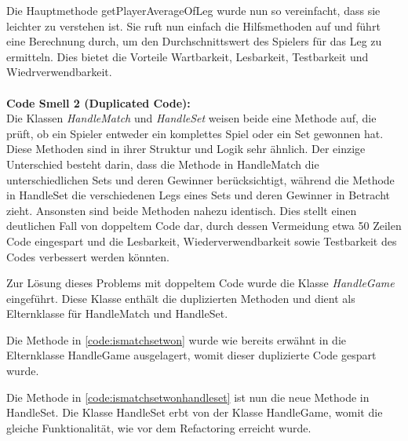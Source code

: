 Die Hauptmethode getPlayerAverageOfLeg wurde nun so vereinfacht, dass sie leichter zu verstehen ist. Sie ruft nun einfach die Hilfsmethoden auf und führt eine Berechnung durch, um den Durchschnittswert des Spielers für das Leg zu ermitteln. Dies bietet die Vorteile Wartbarkeit, Lesbarkeit, Testbarkeit und Wiedrverwendbarkeit.\\\\
\textbf{Code Smell 2 (Duplicated Code):}\\
Die Klassen \textit{HandleMatch} und \textit{HandleSet} weisen beide eine Methode auf, die prüft, ob ein Spieler entweder ein komplettes Spiel oder ein Set gewonnen hat. Diese Methoden sind in ihrer Struktur und Logik sehr ähnlich. Der einzige Unterschied besteht darin, dass die Methode in HandleMatch die unterschiedlichen Sets und deren Gewinner berücksichtigt, während die Methode in HandleSet die verschiedenen Legs eines Sets und deren Gewinner in Betracht zieht. Ansonsten sind beide Methoden nahezu identisch. Dies stellt einen deutlichen Fall von doppeltem Code dar, durch dessen Vermeidung etwa 50 Zeilen Code eingespart und die Lesbarkeit, Wiederverwendbarkeit sowie Testbarkeit des Codes verbessert werden könnten.

Zur Lösung dieses Problems mit doppeltem Code wurde die Klasse \textit{HandleGame} eingeführt. Diese Klasse enthält die duplizierten Methoden und dient als Elternklasse für HandleMatch und HandleSet.

Die Methode in \autoref{code:ismatchsetwon} wurde wie bereits erwähnt in die Elternklasse HandleGame ausgelagert, womit dieser duplizierte Code gespart wurde.

Die Methode in \autoref{code:ismatchsetwonhandleset} ist nun die neue Methode in HandleSet. Die Klasse HandleSet erbt von der Klasse HandleGame, womit die gleiche Funktionalität, wie vor dem Refactoring erreicht wurde.\newpage
